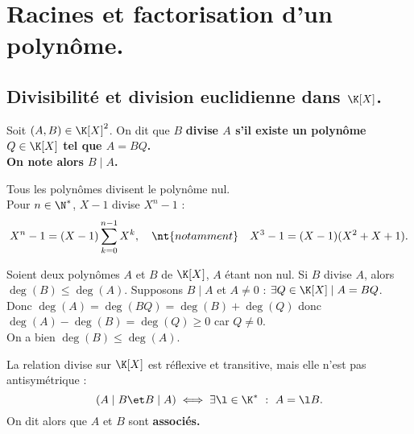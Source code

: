 \documentclass[11pt]{article}
\begin{document}
\section{Racines et factorisation d'un polynôme.}

\subsection{Divisibilité et division euclidienne dans \texorpdfstring{$\K[X]$}{Lg}.}

\begin{defi}{}{}
    Soit $(A,B)\in\K[X]^2$. On dit que $B$ \bf{divise} $A$ s'il existe un polynôme $Q\in\K[X]$ tel que $A=BQ$.\\
    On note alors $B\mid A$.
\end{defi}

\begin{ex}{}{}
    Tous les polynômes divisent le polynôme nul.\\
    Pour $n\in\N^*$, $X-1$ divise $X^n-1$ :
    \begin{equation*}
        X^n - 1 = (X-1)\sum_{k=0}^{n-1}X^k, \quad \nt{notamment} \quad X^3-1=(X-1)(X^2+X+1).
    \end{equation*}
\end{ex}

\pagebreak

\begin{prop}{}{}
    Soient deux polynômes $A$ et $B$ de $\K[X]$, $A$ étant non nul. Si $B$ divise $A$, alors $\deg(B)\leq\deg(A)$.
    \tcblower
    Supposons $B\mid A$ et $A\neq0$ : $\exists Q \in \K[X]\mid A=BQ$.\\
    Donc $\deg(A)=\deg(BQ)=\deg(B)+\deg(Q)$ donc $\deg(A)-\deg(B)=\deg(Q)\geq0$ car $Q\neq0$.\\
    On a bien $\deg(B)\leq\deg(A)$.
\end{prop}

\vspace*{-0.3cm}

\begin{defi}{}{}
    La relation divise sur $\K[X]$ est réflexive et transitive, mais elle n'est pas antisymétrique :
    \begin{equation*}
        (A \mid B \et B \mid A) \iff \exists \l \in \K^* ~:~ A=\l B.
    \end{equation*}
    On dit alors que $A$ et $B$ sont \bf{associés}.
\end{defi}
\end{document}
